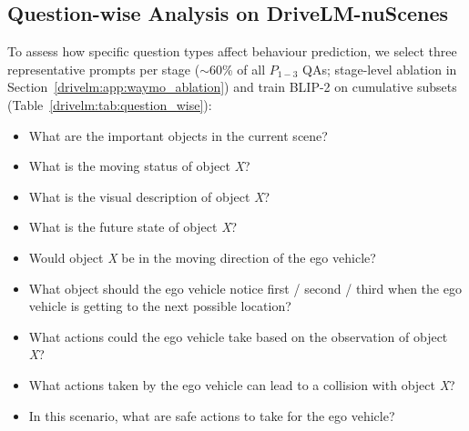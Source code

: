 \subsection{Question-wise Analysis on DriveLM-nuScenes}\label{drivelm:sec:exp_question_wise}

To assess how specific question types affect behaviour prediction, we select three representative prompts per stage ($\sim$60\% of all $P_{1-3}$ QAs; stage-level ablation in Section~\ref{drivelm:app:waymo_ablation}) and train BLIP-2 on cumulative subsets (Table~\ref{drivelm:tab:question_wise}):
\begin{itemize}[leftmargin=4.4em, labelwidth=3.8em, labelsep=0.6em, align=left, itemsep=0pt]
  \item[$P_{1-1}$:] What are the important objects in the current scene?
  \item[$P_{1-2}$:] What is the moving status of object \emph{X}?
  \item[$P_{1-3}$:] What is the visual description of object \emph{X}?
  \item[$P_{2-1}$:] What is the future state of object \emph{X}?
  \item[$P_{2-2}$:] Would object \emph{X} be in the moving direction of the ego vehicle?
  \item[$P_{2-3}$:] What object should the ego vehicle notice first / second / third when the ego vehicle is getting to the next possible location?
  \item[$P_{3-1}$:] What actions could the ego vehicle take based on the observation of object \emph{X}?
  \item[$P_{3-2}$:] What actions taken by the ego vehicle can lead to a collision with object \emph{X}?
  \item[$P_{3-3}$:] In this scenario, what are safe actions to take for the ego vehicle?
\end{itemize}

